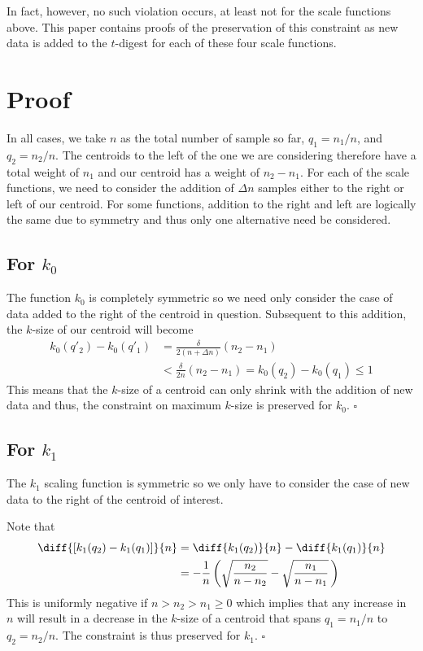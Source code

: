 \documentclass[11pt]{amsart}
\begin{document}
In fact, however, no such violation occurs, at least not for the scale functions above. This paper contains proofs of the preservation of this constraint as new data is added to the $t$-digest for each of these four scale functions.
\section{Proof}
In all cases, we take $n$ as the total number of sample so far, $q_1 = n_1 / n$,  and $q_2 = n_2/n$. The centroids to the left of the one we are considering therefore have a total weight of $n_1$ and our centroid has a weight of $n_2-n_1$. For each of the scale functions, we need to consider the addition of $\Delta n$ samples either to the right or left of our centroid. For some functions, addition to the right and left are logically the same due to symmetry and thus only one alternative need be considered.
\subsection{For $k_0$}
The function $k_0$ is completely symmetric  so we need only consider the case of data added to the right of the centroid in question. Subsequent to this addition, the $k$-size of our centroid will become
\begin{align*}
k_0(q'_2)-k_0(q'_1) &=\frac \delta {2(n+\Delta n)}\left ( n_2 - n_1 \right) \\
&< \frac \delta {2n} \left ( n_2 - n_1 \right)=k_0(q_2) - k_0(q_1) \le 1 
\end{align*}
This means that the $k$-size of a centroid can only shrink with the addition of new data and thus, the constraint on maximum $k$-size is preserved for $k_0$.
$\square$
\subsection{For $k_1$}
The $k_1$ scaling function is symmetric so we only have to consider the case of new data to the right of the centroid of interest. 

Note that
\begin{align*}
\diff {\left[k_1(q_2)-k_1(q_1)\right]} {n} &= \diff {k_1(q_2)}{n} -\diff { k_1(q_1)} {n} \\
&= -\frac {1} n \left( \sqrt{\frac {n_2} {n-{n_2}}} - \sqrt{\frac {n_1} {n-{n_1}}} \,\right)
\end{align*}
This is uniformly negative if $n > n_2 > n_1\ge 0$ which implies that any increase in $n$ will result in a decrease in the $k$-size of a centroid that spans $q_1 = n_1/n$ to $q_2 = n_2/n$. The constraint is thus preserved for $k_1$.
$ \square$
\end{document}
